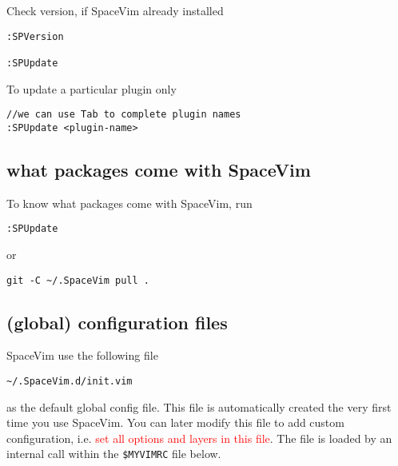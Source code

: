 Check version, if SpaceVim already installed
\begin{verbatim}
:SPVersion

:SPUpdate
\end{verbatim}

To update a particular plugin only
\begin{verbatim}
//we can use Tab to complete plugin names
:SPUpdate <plugin-name>
\end{verbatim}

\subsection{what packages come with SpaceVim}

To know what packages come with SpaceVim, run
\begin{verbatim}
:SPUpdate
\end{verbatim}
or
\begin{verbatim}
git -C ~/.SpaceVim pull .
\end{verbatim}

\subsection{(global) configuration files}
\label{sec:spacevim-configuration}

SpaceVim use the following file
\begin{verbatim}
~/.SpaceVim.d/init.vim
\end{verbatim}
as the default global config file. This file is automatically created the very
first time you use SpaceVim. You can later modify this file to add custom
configuration, i.e. \textcolor{red}{set all options and layers in this
file}. The file is loaded by an internal call within the \verb!$MYVIMRC! file
below.

